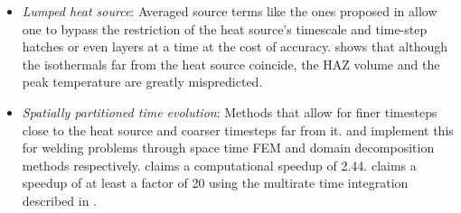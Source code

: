 \begin{itemize}
  \item \textit{Lumped heat source}: Averaged source terms
    like the ones proposed in \cite{Chiumenti2017, Malmelv2019}
    allow one to bypass the restriction of
    the heat source's timescale and time-step hatches
    or even layers at a time at the cost of accuracy.
    \cite{VanElsen2007} shows that although the
    isothermals far from the heat source coincide,
    the HAZ volume and the peak temperature are
    greatly mispredicted.
  \item \textit{Spatially partitioned time evolution}: Methods
    that allow for finer timesteps close to the heat source
    and coarser timesteps far from it. \cite{Kopp2022} and
    \cite{Viguerie2022} implement this for welding problems
    through space time FEM and domain decomposition methods respectively.
    \cite{Viguerie2022} claims a computational speedup of 2.44.
    \cite{Puso2023} claims a speedup of at least a factor of 20
    using the multirate time integration described in \cite{Hodge2021}.
\end{itemize}

\par
